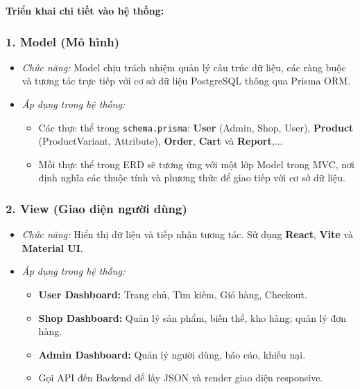 \vspace{0.5cm} %
\noindent \textbf{Triển khai chi tiết vào hệ thống:}

\subsubsection*{1. Model (Mô hình)}
\begin{itemize}
    \item \textit{Chức năng:} Model chịu trách nhiệm quản lý cấu trúc dữ liệu, các ràng buộc và tương tác trực tiếp với cơ sở dữ liệu PostgreSQL thông qua Prisma ORM.
    \item \textit{Áp dụng trong hệ thống:}
        \begin{itemize}
            \item Các thực thể trong \texttt{schema.prisma}: \textbf{User} (Admin, Shop, User), \textbf{Product} (ProductVariant, Attribute), \textbf{Order}, \textbf{Cart} và \textbf{Report},...
            \item Mỗi thực thể trong ERD sẽ tương ứng với một lớp Model trong MVC, nơi định
 nghĩa các thuộc tính và phương thức để giao tiếp với cơ sở dữ liệu.
        \end{itemize}
\end{itemize}

\subsubsection*{2. View (Giao diện người dùng)}
\begin{itemize}
    \item \textit{Chức năng:} Hiển thị dữ liệu và tiếp nhận tương tác. Sử dụng \textbf{React}, \textbf{Vite} và \textbf{Material UI}.
    \item \textit{Áp dụng trong hệ thống:}
        \begin{itemize}
            \item \textbf{User Dashboard:} Trang chủ, Tìm kiếm, Giỏ hàng, Checkout.
            \item \textbf{Shop Dashboard:} Quản lý sản phẩm, biến thể, kho hàng; quản lý đơn hàng.
            \item \textbf{Admin Dashboard:} Quản lý người dùng, báo cáo, khiếu nại.
            \item Gọi API đến Backend để lấy JSON và render giao diện responsive.
        \end{itemize}
\end{itemize}

